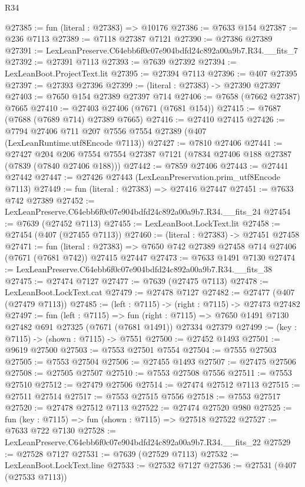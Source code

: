 \begin{lexlean}{R34}
\begin{coremodule}
@27385 := fun (literal : @27383) => @10176
@27386 := @7633 @154
@27387 := @236 @7113
@27389 := @7118 @27387 @7121
@27390 := @27386 @27389
@27391 := LexLeanPreserve.C64ebb6f0c07e904bdfd24c892a00a9b7.R34.__fits_7
@27392 := @27391 @7113
@27393 := @7639 @27392
@27394 := LexLeanBoot.ProjectText.lit
@27395 := @27394 @7113
@27396 := @407 @27395
@27397 := @27393 @27396
@27399 := (literal : @27383) -> @27390 @27397
@27403 := @7650 @154 @27389 @27397 @714
@27406 := @7658 (@7662 @27387) @7665
@27410 := @27403 @27406 (@7671 (@7681 @154))
@27415 := @7687 (@7688 (@7689 @714) @27389 @7665)
@27416 := @27410 @27415
@27426 := @7794 @27406 @711 @207 @7556 @7554 @27389 (@407 (LexLeanRuntime.utf8Encode @7113))
@27427 := @7810 @27406
@27441 := @27427
    @204
    @206
    @7554
    @7554
    @27387
    @7121
    (@7834 @27406 @188 @27387 (@7839 (@7840 @27406 @188)))
@27442 := @7859 @27406
@27443 := @27441 @27442
@27447 := @27426 @27443 (LexLeanPreservation.prim_utf8Encode @7113)
@27449 := fun (literal : @27383) => @27416 @27447
@27451 := @7633 @742 @27389
@27452 := LexLeanPreserve.C64ebb6f0c07e904bdfd24c892a00a9b7.R34.__fits_24
@27454 := @7639 (@27452 @7113)
@27455 := LexLeanBoot.LockText.lit
@27458 := @27454 (@407 (@27455 @7113))
@27460 := (literal : @27383) -> @27451 @27458
@27471 := fun (literal : @27383) =>
  @7650 @742 @27389 @27458 @714 @27406 (@7671 (@7681 @742)) @27415 @27447
@27473 := @7633 @1491 @7130
@27474 := LexLeanPreserve.C64ebb6f0c07e904bdfd24c892a00a9b7.R34.__fits_38
@27475 := @27474 @7127
@27477 := @7639 (@27475 @7113)
@27478 := LexLeanBoot.LockText.cat
@27479 := @27478 @7127
@27482 := @27477 (@407 (@27479 @7113))
@27485 := (left : @7115) -> (right : @7115) -> @27473 @27482
@27497 := fun (left : @7115) =>
  fun (right : @7115) => @7650 @1491 @7130 @27482 @691 @27325 (@7671 (@7681 @1491)) @27334 @27379
@27499 := (key : @7115) -> (shown : @7115) -> @7551
@27500 := @27452 @1493
@27501 := @9619 @27500
@27503 := @7553 @27501 @7554
@27504 := @7555 @27503
@27505 := @7553 @27504
@27506 := @27455 @1493
@27507 := @27475 @27506
@27508 := @27505 @27507
@27510 := @7553 @27508 @7556
@27511 := @7553 @27510
@27512 := @27479 @27506
@27514 := @27474 @27512 @7113
@27515 := @27511 @27514
@27517 := @7553 @27515 @7556
@27518 := @7553 @27517
@27520 := @27478 @27512 @7113
@27522 := @27474 @27520 @980
@27525 := fun (key : @7115) => fun (shown : @7115) => @27518 @27522
@27527 := @7633 @722 @7130
@27528 := LexLeanPreserve.C64ebb6f0c07e904bdfd24c892a00a9b7.R34.__fits_22
@27529 := @27528 @7127
@27531 := @7639 (@27529 @7113)
@27532 := LexLeanBoot.LockText.line
@27533 := @27532 @7127
@27536 := @27531 (@407 (@27533 @7113))

\end{coremodule}
\end{lexlean}
